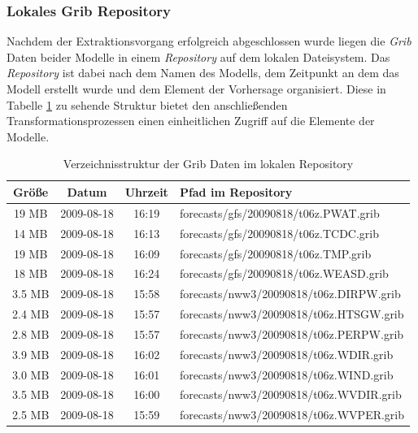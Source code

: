 \subsubsection{Lokales Grib Repository}
Nachdem der Extraktionsvorgang erfolgreich abgeschlossen wurde liegen
die \textit{Grib} Daten beider Modelle in einem \textit{Repository}
auf dem lokalen Dateisystem. Das \textit{Repository} ist dabei nach
dem Namen des Modells, dem Zeitpunkt an dem das Modell erstellt wurde
und dem Element der Vorhersage organisiert. Diese in Tabelle
\ref{tab:repository} zu sehende Struktur bietet den anschließenden
Transformationsprozessen einen einheitlichen Zugriff auf die Elemente
der Modelle.

\begin{table}[h]
  \centering
  {\sf
    \footnotesize
    \begin{longtable}{@{}cccl}
      \toprule
      \textbf{Größe} & \textbf{Datum} & \textbf{Uhrzeit} & \textbf{Pfad im Repository} \\
      \midrule
      19 MB & 2009-08-18 & 16:19 & forecasts/gfs/20090818/t06z.PWAT.grib \\
      14 MB & 2009-08-18 & 16:13 & forecasts/gfs/20090818/t06z.TCDC.grib \\
      19 MB & 2009-08-18 & 16:09 & forecasts/gfs/20090818/t06z.TMP.grib \\
      18 MB & 2009-08-18 & 16:24 & forecasts/gfs/20090818/t06z.WEASD.grib \\
      \midrule
      3.5 MB & 2009-08-18 & 15:58 & forecasts/nww3/20090818/t06z.DIRPW.grib \\
      2.4 MB & 2009-08-18 & 15:57 & forecasts/nww3/20090818/t06z.HTSGW.grib \\
      2.8 MB & 2009-08-18 & 15:57 & forecasts/nww3/20090818/t06z.PERPW.grib \\
      3.9 MB & 2009-08-18 & 16:02 & forecasts/nww3/20090818/t06z.WDIR.grib \\
      3.0 MB & 2009-08-18 & 16:01 & forecasts/nww3/20090818/t06z.WIND.grib \\
      3.5 MB & 2009-08-18 & 16:00 & forecasts/nww3/20090818/t06z.WVDIR.grib \\
      2.5 MB & 2009-08-18 & 15:59 & forecasts/nww3/20090818/t06z.WVPER.grib \\
      \bottomrule
    \end{longtable}
  }
  \caption{Verzeichnisstruktur der Grib Daten im lokalen Repository}
  \label{tab:repository}
\end{table}

